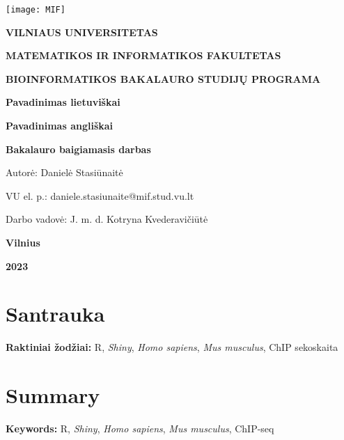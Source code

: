 \documentclass[12pt]{article}
\begin{document}

\begin{titlepage}
\vskip 20pt
\begin{center}
\texttt{[image: MIF]}
\end{center}


\vskip 20pt
\centerline{\bf \large \textbf{VILNIAUS UNIVERSITETAS}}
\bigskip
\centerline{\large \textbf{MATEMATIKOS IR INFORMATIKOS FAKULTETAS}}
\bigskip
\centerline{\large \textbf{BIOINFORMATIKOS BAKALAURO STUDIJŲ PROGRAMA}}

\vskip 90pt
\begin{center}
    {\bf \LARGE Pavadinimas lietuviškai}
\end{center}
\begin{center}
    {\bf \Large Pavadinimas angliškai}
\end{center}
\vskip 20pt
\centerline{\bf \large \textbf{Bakalauro baigiamasis darbas}}
\bigskip
\vskip 40pt

\hskip 140pt {\large Autorė: Danielė Stasiūnaitė}

\hskip 140pt{\large VU el. p.: daniele.stasiunaite@mif.stud.vu.lt}
\bigskip
\vskip 20pt

\hskip 140pt {\large Darbo vadovė: J. m. d. Kotryna Kvederavičiūtė}
\vskip 60pt
\vskip 40pt
\centerline{\large \textbf{Vilnius}}
\centerline{\large \textbf{2023}}
\newpage
\end{titlepage}



\tableofcontents
\newpage


\section*{Santrauka}
\hfill \break
\textbf{Raktiniai žodžiai:} R, \emph{Shiny}, \emph{Homo sapiens},
\emph{Mus musculus}, ChIP sekoskaita

\newpage


\section*{Summary}
\hfill \break
\textbf{Keywords:} R, \emph{Shiny}, \emph{Homo sapiens},
\emph{Mus musculus}, ChIP-seq
\end{document}
